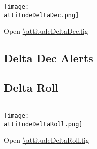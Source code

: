\begin{table}[htb!]
  \begin{tabularx}{\tablewidth}{X R}
    \toprule
    
    \bottomrule
  \end{tabularx}
\end{table} 

\begin{center}
  \texttt{[image: \\attitudeDeltaDec.png]}
\end{center}
Open \url{\attitudeDeltaDec.fig}

\clearpage

\subsection{Delta Dec Alerts}

%

\clearpage

\subsection{Delta Roll}

\begin{table}[htb!]
  \begin{tabularx}{\tablewidth}{X R}
    \toprule
    
    \bottomrule
  \end{tabularx}
\end{table} 

\begin{center}
  \texttt{[image: \\attitudeDeltaRoll.png]}
\end{center}
Open \url{\attitudeDeltaRoll.fig}

